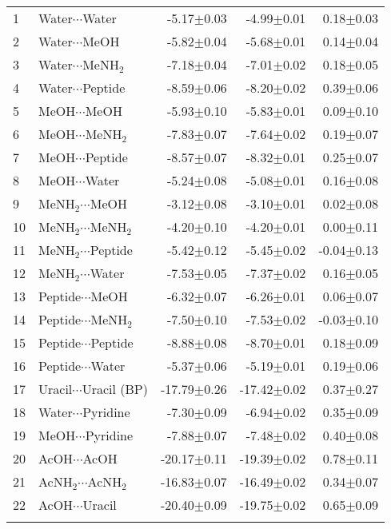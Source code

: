 \begin{longtable}{llrrr}
1 & Water$\cdots$Water & -5.17$\pm$0.03 & -4.99$\pm$0.01 & 0.18$\pm$0.03  \\
2 & Water$\cdots$MeOH & -5.82$\pm$0.04 & -5.68$\pm$0.01 & 0.14$\pm$0.04  \\
3 & Water$\cdots$MeNH$_2$ & -7.18$\pm$0.04 & -7.01$\pm$0.02 & 0.18$\pm$0.05  \\
4 & Water$\cdots$Peptide & -8.59$\pm$0.06 & -8.20$\pm$0.02 & 0.39$\pm$0.06  \\
5 & MeOH$\cdots$MeOH & -5.93$\pm$0.10 & -5.83$\pm$0.01 & 0.09$\pm$0.10  \\
6 & MeOH$\cdots$MeNH$_2$ & -7.83$\pm$0.07 & -7.64$\pm$0.02 & 0.19$\pm$0.07  \\
7 & MeOH$\cdots$Peptide & -8.57$\pm$0.07 & -8.32$\pm$0.01 & 0.25$\pm$0.07  \\
8 & MeOH$\cdots$Water & -5.24$\pm$0.08 & -5.08$\pm$0.01 & 0.16$\pm$0.08  \\
9 & MeNH$_2$$\cdots$MeOH & -3.12$\pm$0.08 & -3.10$\pm$0.01 & 0.02$\pm$0.08  \\
10 & MeNH$_2$$\cdots$MeNH$_2$ & -4.20$\pm$0.10 & -4.20$\pm$0.01 & 0.00$\pm$0.11  \\
11 & MeNH$_2$$\cdots$Peptide & -5.42$\pm$0.12 & -5.45$\pm$0.02 & -0.04$\pm$0.13  \\
12 & MeNH$_2$$\cdots$Water & -7.53$\pm$0.05 & -7.37$\pm$0.02 & 0.16$\pm$0.05  \\
13 & Peptide$\cdots$MeOH & -6.32$\pm$0.07 & -6.26$\pm$0.01 & 0.06$\pm$0.07  \\
14 & Peptide$\cdots$MeNH$_2$ & -7.50$\pm$0.10 & -7.53$\pm$0.02 & -0.03$\pm$0.10  \\
15 & Peptide$\cdots$Peptide & -8.88$\pm$0.08 & -8.70$\pm$0.01 & 0.18$\pm$0.09  \\
16 & Peptide$\cdots$Water & -5.37$\pm$0.06 & -5.19$\pm$0.01 & 0.19$\pm$0.06  \\
17 & Uracil$\cdots$Uracil (BP) & -17.79$\pm$0.26 & -17.42$\pm$0.02 & 0.37$\pm$0.27  \\
18 & Water$\cdots$Pyridine & -7.30$\pm$0.09 & -6.94$\pm$0.02 & 0.35$\pm$0.09  \\
19 & MeOH$\cdots$Pyridine & -7.88$\pm$0.07 & -7.48$\pm$0.02 & 0.40$\pm$0.08  \\
20 & AcOH$\cdots$AcOH & -20.17$\pm$0.11 & -19.39$\pm$0.02 & 0.78$\pm$0.11  \\
21 & AcNH$_2$$\cdots$AcNH$_2$ & -16.83$\pm$0.07 & -16.49$\pm$0.02 & 0.34$\pm$0.07  \\
22 & AcOH$\cdots$Uracil & -20.40$\pm$0.09 & -19.75$\pm$0.02 & 0.65$\pm$0.09  \\
$$
\end{longtable}
